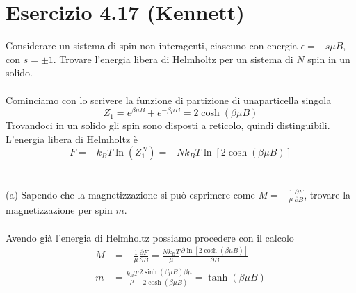 \documentclass[a4paper]{article}
\begin{document}
    \section*{Esercizio 4.17 (Kennett)}
        Considerare un sistema di spin non interagenti, ciascuno con energia $\epsilon=-s\mu B$, con $s=\pm 1$.
        Trovare l'energia libera di Helmholtz per un sistema di $N$ spin in un solido.
        \\
        \\
        Cominciamo con lo scrivere la funzione di partizione di unaparticella singola
        \begin{equation*}
            Z_1=e^{\beta\mu B}+e^{-\beta\mu B}=2\cosh(\beta\mu B)
        \end{equation*}
        Trovandoci in un solido gli spin sono disposti a reticolo, quindi distinguibili.
        L'energia libera di Helmholtz è
        \begin{equation*}
            F=-k_BT\ln(Z_1^N)=-Nk_BT\ln[2\cosh(\beta\mu B)]
        \end{equation*}
        \\
        \\
        (a) Sapendo che la magnetizzazione si può esprimere come $M=-\frac{1}{\mu}\frac{\partial F}{\partial B}$, trovare la magnetizzazione per spin $m$.
        \\
        \\
        Avendo già l'energia di Helmholtz possiamo procedere con il calcolo
        \begin{equation*}
            \begin{split}
                M&=-\frac{1}{\mu}\frac{\partial F}{\partial B}=\frac{Nk_BT}{\mu}\frac{\partial\ln[2\cosh(\beta\mu B)]}{\partial B}\\
                m&=\frac{k_BT}{\mu}\frac{2\sinh(\beta\mu B)\beta\mu}{2\cosh(\beta\mu B)}=\tanh(\beta\mu B)
            \end{split}
        \end{equation*}
        \begin{center}
        \end{center}
\end{document}
